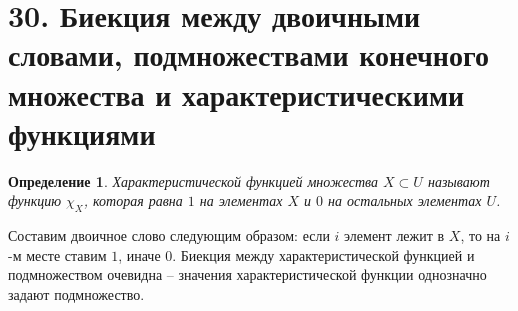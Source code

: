 \documentclass[a4paper,12pt]{article}
\newtheorem*{defin}{Определение}
\begin{document}
    \section*{30. Биекция между двоичными словами, подмножествами конечного множества и характеристическими функциями}

        \begin{defin}
            Характеристической функцией множества $X \subset U$ называют функцию $\displaystyle\chi_{X}$, которая равна $1$ на элементах $X$ и $0$ на остальных элементах $U$.
        \end{defin}
        Составим двоичное слово следующим образом: если $i$ элемент лежит в $X$, то на $i$-м месте ставим $1$, иначе $0$. Биекция между характеристической функцией и подмножеством очевидна -- значения характеристической функции однозначно задают подмножество.
\end{document}
